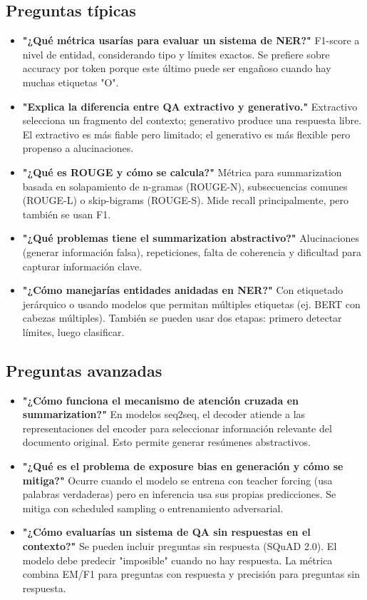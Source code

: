 \documentclass[12pt,a4paper,openany,oneside]{book}
\begin{document}
\subsection{Preguntas típicas}
\begin{itemize}
    \item \textbf{"¿Qué métrica usarías para evaluar un sistema de NER?"}
    F1-score a nivel de entidad, considerando tipo y límites exactos. Se prefiere sobre accuracy por token porque este último puede ser engañoso cuando hay muchas etiquetas "O".
    
    \item \textbf{"Explica la diferencia entre QA extractivo y generativo."}
    Extractivo selecciona un fragmento del contexto; generativo produce una respuesta libre. El extractivo es más fiable pero limitado; el generativo es más flexible pero propenso a alucinaciones.
    
    \item \textbf{"¿Qué es ROUGE y cómo se calcula?"}
    Métrica para summarization basada en solapamiento de n-gramas (ROUGE-N), subsecuencias comunes (ROUGE-L) o skip-bigrams (ROUGE-S). Mide recall principalmente, pero también se usan F1.
    
    \item \textbf{"¿Qué problemas tiene el summarization abstractivo?"}
    Alucinaciones (generar información falsa), repeticiones, falta de coherencia y dificultad para capturar información clave.
    
    \item \textbf{"¿Cómo manejarías entidades anidadas en NER?"}
    Con etiquetado jerárquico o usando modelos que permitan múltiples etiquetas (ej. BERT con cabezas múltiples). También se pueden usar dos etapas: primero detectar límites, luego clasificar.
\end{itemize}

\subsection{Preguntas avanzadas}
\begin{itemize}
    \item \textbf{"¿Cómo funciona el mecanismo de atención cruzada en summarization?"}
    En modelos seq2seq, el decoder atiende a las representaciones del encoder para seleccionar información relevante del documento original. Esto permite generar resúmenes abstractivos.
    
    \item \textbf{"¿Qué es el problema de exposure bias en generación y cómo se mitiga?"}
    Ocurre cuando el modelo se entrena con teacher forcing (usa palabras verdaderas) pero en inferencia usa sus propias predicciones. Se mitiga con scheduled sampling o entrenamiento adversarial.
    
    \item \textbf{"¿Cómo evaluarías un sistema de QA sin respuestas en el contexto?"}
    Se pueden incluir preguntas sin respuesta (SQuAD 2.0). El modelo debe predecir "imposible" cuando no hay respuesta. La métrica combina EM/F1 para preguntas con respuesta y precisión para preguntas sin respuesta.
\end{itemize}
\end{document}
